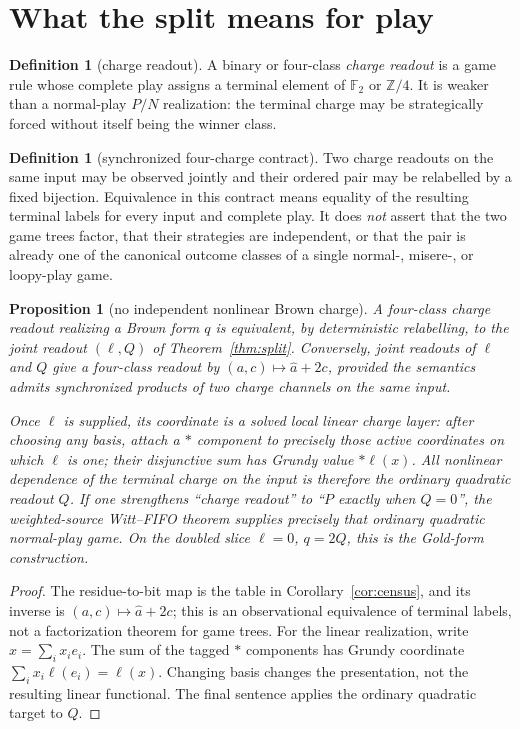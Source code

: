 \documentclass[11pt]{article}
\newtheorem{proposition}[theorem]{Proposition}
\theoremstyle{definition}
\newtheorem{definition}[theorem]{Definition}
\theoremstyle{remark}
\newcommand{\Z}{\mathbb Z}
\newcommand{\F}{\mathbb F}
\begin{document}
\section{What the split means for play}

\begin{definition}[charge readout]
A binary or four-class \emph{charge readout} is a game rule whose complete
play assigns a terminal element of $\F_2$ or $\Z/4$.  It is weaker than a
normal-play $P/N$ realization: the terminal charge may be strategically forced
without itself being the winner class.
\end{definition}

\begin{definition}[synchronized four-charge contract]
Two charge readouts on the same input may be observed jointly and their
ordered pair may be relabelled by a fixed bijection.  Equivalence in this
contract means equality of the resulting terminal labels for every input and
complete play.  It does \emph{not} assert that the two game trees factor, that
their strategies are independent, or that the pair is already one of the
canonical outcome classes of a single normal-, misere-, or loopy-play game.
\end{definition}

\begin{proposition}[no independent nonlinear Brown charge]
\label{prop:game-split}
A four-class charge readout realizing a Brown form $q$ is equivalent,
by deterministic relabelling, to the joint readout $(\ell,Q)$ of
Theorem~\ref{thm:split}.  Conversely, joint readouts of $\ell$ and $Q$ give a
four-class readout by $(a,c)\mapsto\widehat a+2c$, provided the semantics
admits synchronized products of two charge channels on the same input.

Once $\ell$ is supplied, its coordinate is a solved local linear charge
layer: after choosing any basis, attach a $*$ component to precisely those
active coordinates on which $\ell$ is one; their disjunctive sum has Grundy
value $*\ell(x)$.  All nonlinear dependence of the terminal charge on the
input is therefore the ordinary quadratic readout $Q$.
If one strengthens ``charge readout'' to ``$P$ exactly when $Q=0$'', the
weighted-source Witt--FIFO theorem supplies precisely that ordinary
quadratic normal-play game.  On the doubled slice $\ell=0$, $q=2Q$, this is
the Gold-form construction.
\end{proposition}

\begin{proof}
The residue-to-bit map is the table in Corollary~\ref{cor:census}, and its
inverse is $(a,c)\mapsto\widehat a+2c$; this is an observational equivalence
of terminal labels, not a factorization theorem for game trees.
For the linear realization, write $x=\sum_i x_i e_i$.  The sum of the tagged
$*$ components has Grundy coordinate
$\sum_i x_i\ell(e_i)=\ell(x)$.  Changing basis changes the presentation, not
the resulting linear functional.  The final sentence applies the ordinary
quadratic target to $Q$.
\end{proof}
\end{document}
